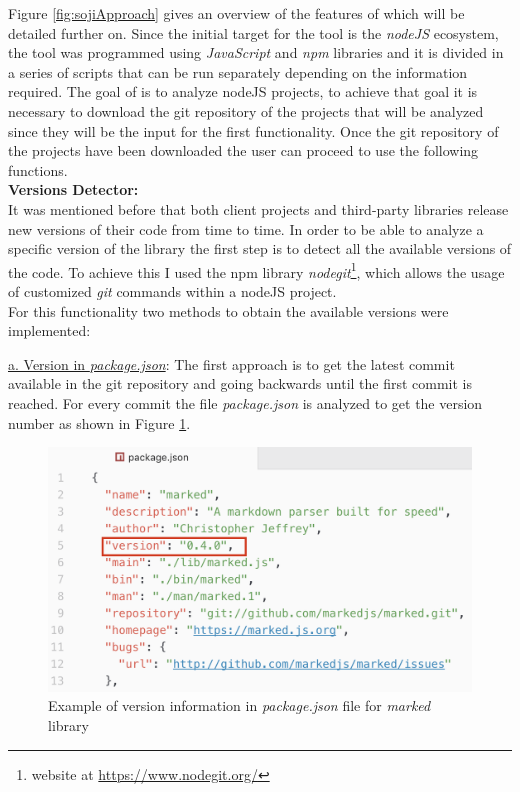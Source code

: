 Figure \ref{fig:sojiApproach} gives an overview of the features of \tool[] which will be detailed further on.
Since the initial target for the tool is the \textit{nodeJS} ecosystem, the tool was programmed using \textit{JavaScript} and \textit{npm} libraries and it is divided in a series of scripts that can be run separately depending on the information required.
The goal of \tool[] is to analyze nodeJS projects, to achieve that goal it is necessary to download the git repository of the projects that will be analyzed since they will be the input for the first functionality. 
\enlargethispage{\baselineskip}
Once the git repository of the projects have been downloaded the user can proceed to use the following functions.\\

\textbf{Versions Detector:}\\
It was mentioned before that both client projects and third-party libraries release new versions of their code from time to time. 
In order to be able to analyze a specific version of the library the first step is to detect all the available versions of the code.
To achieve this I used the npm library \textit{nodegit}\footnote{website at \url{https://www.nodegit.org/}}, which allows the usage of customized \textit{git} commands within a nodeJS project.
\\
For this functionality two methods to obtain the available versions were implemented:

\underline{a. Version in \textit{package.json}}:
The first approach is to get the latest commit available in the git repository and going backwards until the first commit is reached. 
For every commit the file \textit{package.json} is analyzed to get the version number as shown in Figure \ref{fig:pkgVerExample}. 

\begin{figure}[ht!]
\centering
\includegraphics[width=1\textwidth]{images/ver_pkg_example.png}
\caption{Example of version information in \textit{package.json} file for \textit{marked} library}
\label{fig:pkgVerExample}
\end{figure}

